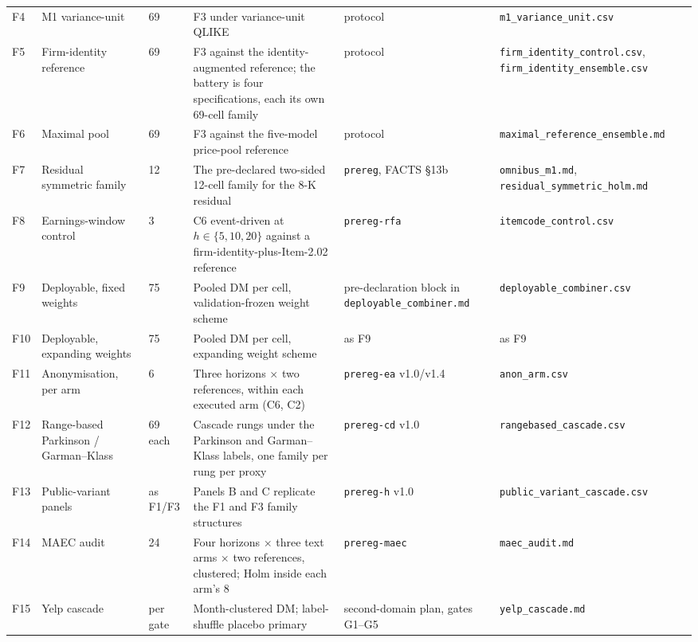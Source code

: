 \begin{table}[htbp]
\begin{tabular}{@{}l>{\raggedright\arraybackslash}p{}l>{\raggedright\arraybackslash}p{}>{\raggedright\arraybackslash}p{}>{\raggedright\arraybackslash}p{}@{}}
F4 & M1 variance-unit & 69 & F3 under variance-unit QLIKE & protocol & \texttt{m1\_\allowbreak variance\_\allowbreak unit.csv} \\
F5 & Firm-identity reference & 69 & F3 against the identity-augmented reference; the battery is four specifications, each its own 69-cell family & protocol & \texttt{firm\_\allowbreak identity\_\allowbreak control.csv}, \texttt{firm\_\allowbreak identity\_\allowbreak ensemble.csv} \\
F6 & Maximal pool & 69 & F3 against the five-model price-pool reference & protocol & \texttt{maximal\_\allowbreak reference\_\allowbreak ensemble.md} \\
\addlinespace
F7 & Residual symmetric family & 12 & The pre-declared two-sided 12-cell family for the 8-K residual & \texttt{prereg}, FACTS \S13b & \texttt{omnibus\_\allowbreak m1.md}, \texttt{residual\_\allowbreak symmetric\_\allowbreak holm.md} \\
F8 & Earnings-window control & 3 & C6 event-driven at $h \in \{5, 10, 20\}$ against a firm-identity-plus-Item-2.02 reference & \texttt{prereg-rfa} & \texttt{itemcode\_\allowbreak control.csv} \\
\addlinespace
F9 & Deployable, fixed weights & 75 & Pooled DM per cell, validation-frozen weight scheme & pre-declaration block in \texttt{deployable\_\allowbreak combiner.md} & \texttt{deployable\_\allowbreak combiner.csv} \\
F10 & Deployable, expanding weights & 75 & Pooled DM per cell, expanding weight scheme & as F9 & as F9 \\
\addlinespace
F11 & Anonymisation, per arm & 6 & Three horizons $\times$ two references, within each executed arm (C6, C2) & \texttt{prereg-ea} v1.0/v1.4 & \texttt{anon\_\allowbreak arm.csv} \\
F12 & Range-based Parkinson / Garman--Klass & 69 each & Cascade rungs under the Parkinson and Garman--Klass labels, one family per rung per proxy & \texttt{prereg-cd} v1.0 & \texttt{rangebased\_\allowbreak cascade.csv} \\
F13 & Public-variant panels & as F1/F3 & Panels B and C replicate the F1 and F3 family structures & \texttt{prereg-h} v1.0 & \texttt{public\_\allowbreak variant\_\allowbreak cascade.csv} \\
F14 & MAEC audit & 24 & Four horizons $\times$ three text arms $\times$ two references, clustered; Holm inside each arm's 8 & \texttt{prereg-maec} & \texttt{maec\_\allowbreak audit.md} \\
F15 & Yelp cascade & per gate & Month-clustered DM; label-shuffle placebo primary & second-domain plan, gates G1--G5 & \texttt{yelp\_\allowbreak cascade.md} \\
\bottomrule
\end{tabular}
\end{table}

